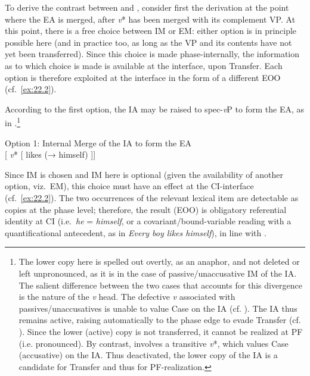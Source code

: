 \documentclass[output=paper]{langsci/langscibook}
\begin{document}
To derive the contrast between  and ,
consider first the derivation at the point where the \gls{EA} is merged, after
\emph{v}* has been merged with its complement VP. At this point, there is a
free choice between \gls{IM} or \gls{EM}: either option is in principle
possible here (and in practice too, as long as the VP and its contents have not
yet been transferred). Since this choice is made phase-internally,
the information as to which choice is made is available at the interface, upon
Transfer. Each option is therefore exploited at the interface in the form of a
different \gls{EOO} (cf.\ \ref{ex:22.2}).

According to the first option, the \gls{IA} may be raised to spec-\emph{v}P to
form the \gls{EA}, as in .\footnote{The lower copy here is
    spelled out overtly, as an anaphor, and not deleted or left unpronounced,
    as it is in the case of passive/unaccusative \gls{IM} of the \gls{IA}.  The
    salient difference between the two cases that accounts for this divergence
    is the nature of the \emph{v} head. The defective \emph{v} associated with
    passives/unaccusatives is unable to value Case on the \gls{IA} (cf.
    \citealt{Chomsky2001}). The \gls{IA} thus remains active, raising
    automatically to the phase edge to evade Transfer (cf.
    \citealt{Chomsky2000}). Since the lower (active) copy is not transferred,
    it cannot be realized at \gls{PF} (i.e.  pronounced). By contrast,
     involves a transitive \emph{v}*, which values Case
    (accusative) on the \gls{IA}. Thus deactivated, the lower copy of the
    \gls{IA} is a candidate for Transfer and thus for PF-realization.}

\ea\label{ex:22.10}Option 1: Internal Merge of the \gls{IA} to form the \gls{EA}\\
    {}[\emph{}  \emph{v}* [ likes  (→ himself) ]]
    \vspace{1\baselineskip}
\z

Since \gls{IM} is chosen and \gls{IM} here is optional (given the availability
of another option, viz.\ \gls{EM}), this choice must have an effect at the
CI-interface (cf.\ \ref{ex:22.2}). The two occurrences of the relevant lexical
item are detectable as copies at the phase level; therefore, the result
(\gls{EOO}) is obligatory referential identity at \gls{CI} (i.e.\ \emph{he} =
\emph{himself}, or a covariant/bound-variable reading with a quantificational
antecedent, as in \emph{Every boy likes himself}), in line with
.
\end{document}
